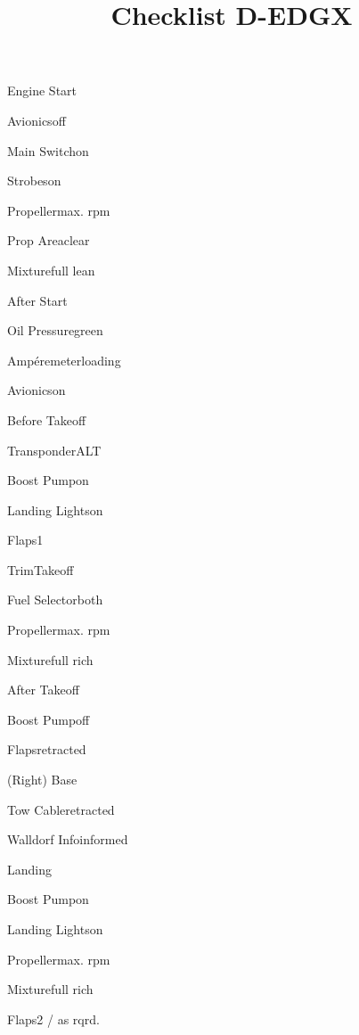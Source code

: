 \def\papersize{6}




\title{Checklist D-EDGX}

\begin{checklist}{Engine Start}
  \item{Avionics}{off}
  \item{Main Switch}{on}
  \item{Strobes}{on}
  \item{Propeller}{max. rpm}
  \item{Prop Area}{clear}
  \item{Mixture}{full lean}
\end{checklist}

\begin{checklist}{After Start}
  \item{Oil Pressure}{green}
  \item{Ampéremeter}{loading}
  \item{Avionics}{on}
\end{checklist}

\begin{checklist}{Before Takeoff}
  \item{Transponder}{ALT}
  \item{Boost Pump}{on}
  \item{Landing Lights}{on}
  \item{Flaps}{1}
  \item{Trim}{Takeoff}
  \item{Fuel Selector}{both}
  \item{Propeller}{max. rpm}
  \item{Mixture}{full rich}
\end{checklist}

\begin{checklist}{After Takeoff}
  \item{Boost Pump}{off}
  \item{Flaps}{retracted}
\end{checklist}

\begin{checklist}{(Right) Base}
  \item{Tow Cable}{retracted}
  \item{Walldorf Info}{informed}
\end{checklist}

\begin{checklist}{Landing}
  \item{Boost Pump}{on}
  \item{Landing Lights}{on}
  \item{Propeller}{max. rpm}
  \item{Mixture}{full rich}
  \item{Flaps}{2 / as rqrd.}
\end{checklist}

